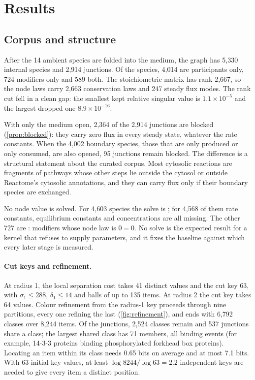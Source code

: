 \section{Results}
\label{sec:results}

\subsection{Corpus and structure}
\label{sec:res-corpus}

After the 14 ambient species are folded into the medium, the graph has 5{,}330 internal species and 2{,}914 junctions.
Of the species, 4{,}014 are participants only, 724 modifiers only and 589 both.
The stoichiometric matrix has rank 2{,}667, so the node laws carry 2{,}663 conservation laws and 247 steady flux modes.
The rank cut fell in a clean gap: the smallest kept relative singular value is $1.1\times10^{-5}$ and the largest dropped one $8.9\times10^{-16}$.

With only the medium open, 2{,}364 of the 2{,}914 junctions are blocked (\cref{prop:blocked}): they carry zero flux in every steady state, whatever the rate constants.
When the 4{,}002 boundary species, those that are only produced or only consumed, are also opened, 95 junctions remain blocked.
The difference is a structural statement about the curated corpus.
Most cytosolic reactions are fragments of pathways whose other steps lie outside the cytosol or outside Reactome's cytosolic annotations, and they can carry flux only if their boundary species are exchanged.

No node value is solved.
For 4{,}603 species the solve is ; for 4{,}568 of them rate constants, equilibrium constants and concentrations are all missing.
The other 727 are : modifiers whose node law is $0=0$.
No solve is the expected result for a kernel that refuses to supply parameters, and it fixes the baseline against which every later stage is measured.

\paragraph{Cut keys and refinement.}
At radius 1, the local separation cost takes 41 distinct values and the cut key 63, with $\sigma_1\le288$, $\delta_1\le14$ and balls of up to 135 items.
At radius 2 the cut key takes 64 values.
Colour refinement from the radius-1 key proceeds through nine partitions, every one refining the last (\cref{fig:refinement}), and ends with 6{,}792 classes over 8{,}244 items.
Of the junctions, 2{,}524 classes remain and 537 junctions share a class; the largest shared class has 71 members, all binding events (for example, 14-3-3 proteins binding phosphorylated forkhead box proteins).
Locating an item within its class needs 0.65 bits on average and at most 7.1 bits.
With 63 initial key values, at least $\log 8244/\log 63 = 2.2$ independent keys are needed to give every item a distinct position.

